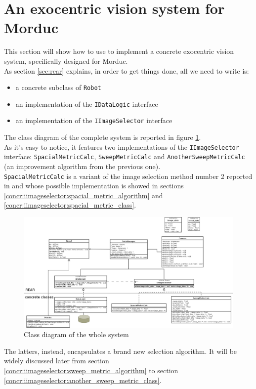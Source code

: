 \setcounter{figure}{0}
\setcounter{table}{0}
\setcounter{lstlisting}{0}

\section{An exocentric vision system for Morduc}
\label{sec:concr}

This section will show how to use \framework{} to implement a 
concrete exocentric vision system, specifically designed for 
Morduc.
\\
As section \ref{sec:rear} explains, in order to get things 
done, all we need to write is:

\begin{itemize}
\item a concrete subclass of \texttt{Robot}
\item an implementation of the \texttt{IDataLogic} interface
\item an implementation of the \texttt{IImageSelector} interface
\end{itemize}

The class diagram of the complete system is reported in figure 
\ref{fig:class_diagram_complete}. 
\\
As it's easy to notice, it features two implementations 
of the \texttt{IImageSelector} interface: \texttt{SpacialMetricCalc},
\texttt{SweepMetricCalc} and \texttt{AnotherSweepMetricCalc}
(an improvement algorithm from the previous one).
\\
\texttt{SpacialMetricCalc} is a variant 
of the image selection method number 2 reported in \cite{sugimoto} and 
whose possible implementation is showed in sections
\ref{concr:iimageselector:spacial_metric_algorithm} and
\ref{concr:iimageselector:spacial_metric_class}.

\begin{figure}[!h]
  \begin{center}
    \includegraphics[width=\textwidth]{img/class_diagram.png} 
    \caption{Class diagram of the whole system}
    \label{fig:class_diagram_complete}
  \end{center}
\end{figure}

The latters, instead, encapsulates a brand new selection algorithm. 
It will be widely discussed later from section
\ref{concr:iimageselector:sweep_metric_algorithm} to section
\ref{concr:iimageselector:another_sweep_metric_class}.

\newpage

\newpage

\newpage

